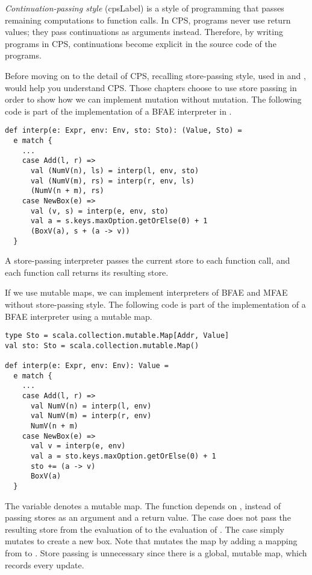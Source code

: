 \textit{Continuation-passing style}
(\acrshort{cpsLabel}) is a style of programming that
passes remaining computations to function calls. In CPS, programs never
use return values; they pass continuations as arguments instead. Therefore, by
writing programs in CPS, continuations become explicit in the source code of the
programs.

Before moving on to the detail of CPS, recalling
store-passing style, used in  and , would help you
understand CPS. Those chapters
choose to use store passing in order to show how we can implement mutation
without mutation. The following code is part of the implementation of a
\textsf{BFAE} interpreter in .
\begin{verbatim}
def interp(e: Expr, env: Env, sto: Sto): (Value, Sto) =
  e match {
    ...
    case Add(l, r) =>
      val (NumV(n), ls) = interp(l, env, sto)
      val (NumV(m), rs) = interp(r, env, ls)
      (NumV(n + m), rs)
    case NewBox(e) =>
      val (v, s) = interp(e, env, sto)
      val a = s.keys.maxOption.getOrElse(0) + 1
      (BoxV(a), s + (a -> v))
  }
\end{verbatim}
A store-passing interpreter passes the current store to each function call, and
each function call returns its resulting store.

If we use mutable maps, we can implement interpreters of
\textsf{BFAE} and \textsf{MFAE} without store-passing style. The following code
is part of the implementation of a \textsf{BFAE} interpreter using a mutable map.
\begin{verbatim}
type Sto = scala.collection.mutable.Map[Addr, Value]
val sto: Sto = scala.collection.mutable.Map()

def interp(e: Expr, env: Env): Value =
  e match {
    ...
    case Add(l, r) =>
      val NumV(n) = interp(l, env)
      val NumV(m) = interp(r, env)
      NumV(n + m)
    case NewBox(e) =>
      val v = interp(e, env)
      val a = sto.keys.maxOption.getOrElse(0) + 1
      sto += (a -> v)
      BoxV(a)
  }
\end{verbatim}
The variable  denotes a mutable map. The function 
depends on , instead of passing stores as an argument and a return value.
The  case does not pass the resulting store from the evaluation of
 to the evaluation of .
The  case simply mutates  to create a new box.
Note that  mutates the map by adding a mapping from
 to .
Store passing is unnecessary since there is a global, mutable map, which records every update.


